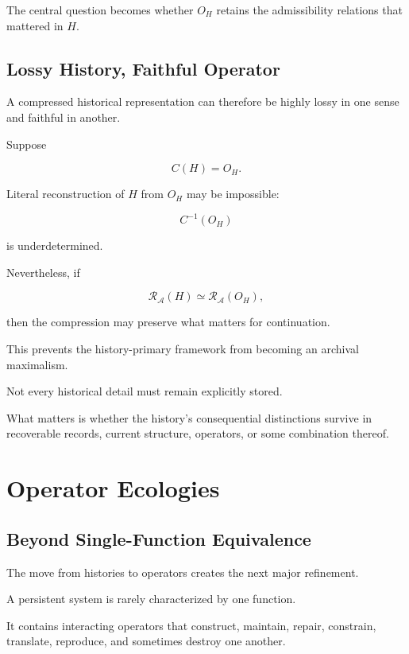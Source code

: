 \documentclass[11pt]{article}
\theoremstyle{remark}
\newcommand{\Adm}{\mathcal{A}}
\newcommand{\Reach}{\mathcal{R}}
\begin{document}
The central question becomes whether $O_H$ retains the admissibility relations that mattered in $H$.

\subsection{Lossy History, Faithful Operator}

A compressed historical representation can therefore be highly lossy in one sense and faithful in another.

Suppose

\begin{equation}
C(H)=O_H.
\end{equation}

Literal reconstruction of $H$ from $O_H$ may be impossible:

\begin{equation}
C^{-1}(O_H)
\end{equation}

is underdetermined.

Nevertheless, if

\begin{equation}
\Reach_{\Adm}(H)
\simeq
\Reach_{\Adm}(O_H),
\end{equation}

then the compression may preserve what matters for continuation.

This prevents the history-primary framework from becoming an archival maximalism.

Not every historical detail must remain explicitly stored.

What matters is whether the history's consequential distinctions survive in recoverable records, current structure, operators, or some combination thereof.

\section{Operator Ecologies}

\subsection{Beyond Single-Function Equivalence}

The move from histories to operators creates the next major refinement.

A persistent system is rarely characterized by one function.

It contains interacting operators that construct, maintain, repair, constrain, translate, reproduce, and sometimes destroy one another.
\end{document}
